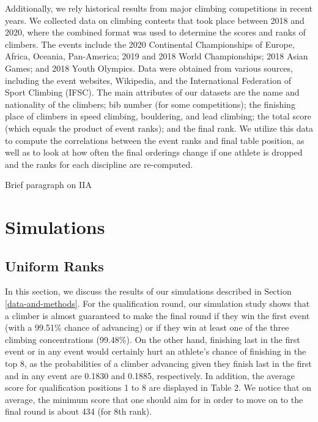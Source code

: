 \documentclass[12pt]{article}
\begin{document}
Additionally, we rely historical results from major climbing
competitions in recent years. We collected data on climbing contests
that took place between 2018 and 2020, where the combined format was
used to determine the scores and ranks of climbers. The events include
the 2020 Continental Championships of Europe, Africa, Oceania,
Pan-America; 2019 and 2018 World Championships; 2018 Asian Games; and
2018 Youth Olympics. Data were obtained from various sources, including
the event websites, Wikipedia, and the International Federation of Sport
Climbing (IFSC). The main attributes of our datasets are the name and
nationality of the climbers; bib number (for some competitions); the
finishing place of climbers in speed climbing, bouldering, and lead
climbing; the total score (which equals the product of event ranks); and
the final rank. We utilize this data to compute the correlations between
the event ranks and final table position, as well as to look at how
often the final orderings change if one athlete is dropped and the ranks
for each discipline are re-computed.

Brief paragraph on IIA

\hypertarget{simulations}{%
\section{Simulations}\label{simulations}}

\hypertarget{uniform-ranks}{%
\subsection{Uniform Ranks}\label{uniform-ranks}}

In this section, we discuss the results of our simulations described in
Section \ref{data-and-methods}. For the qualification round, our
simulation study shows that a climber is almost guaranteed to make the
final round if they win the first event (with a 99.51\% chance of
advancing) or if they win at least one of the three climbing
concentrations (99.48\%). On the other hand, finishing last in the first
event or in any event would certainly hurt an athlete's chance of
finishing in the top 8, as the probabilities of a climber advancing
given they finish last in the first and in any event are 0.1830 and
0.1885, respectively. In addition, the average score for qualification
positions 1 to 8 are displayed in Table 2. We notice that on average,
the minimum score that one should aim for in order to move on to the
final round is about 434 (for 8th rank).
\end{document}
